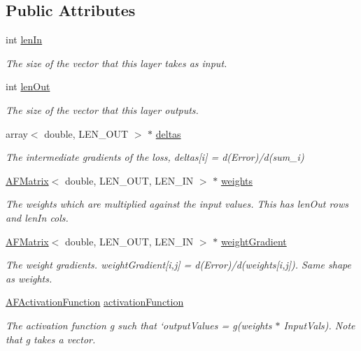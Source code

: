 \subsection*{Public Attributes}
\begin{DoxyCompactItemize}
\item 
int \hyperlink{class_layer_a844e22c542ae02cb475cabb8353300a8}{len\+In}
\begin{DoxyCompactList}\small\item\em The size of the vector that this layer takes as input. \end{DoxyCompactList}\item 
int \hyperlink{class_layer_ae10a61035ba7a18f9f2a6d1d3ebf9811}{len\+Out}
\begin{DoxyCompactList}\small\item\em The size of the vector that this layer outputs. \end{DoxyCompactList}\item 
array$<$ double, L\+E\+N\+\_\+\+O\+UT $>$ $\ast$ \hyperlink{class_layer_aeefbb274f205f4960c4a1a3ed5f5d807}{deltas}
\begin{DoxyCompactList}\small\item\em The intermediate gradients of the loss, {\ttfamily deltas\mbox{[}i\mbox{]} = d(\+Error)/d(sum\+\_\+i)} \end{DoxyCompactList}\item 
\hyperlink{class_a_f_matrix}{A\+F\+Matrix}$<$ double, L\+E\+N\+\_\+\+O\+UT, L\+E\+N\+\_\+\+IN $>$ $\ast$ \hyperlink{class_layer_aa362ee5edaf5b0fe8d5d7c4674ded7a1}{weights}
\begin{DoxyCompactList}\small\item\em The weights which are multiplied against the input values. This has {\ttfamily len\+Out} rows and {\ttfamily len\+In} cols. \end{DoxyCompactList}\item 
\hyperlink{class_a_f_matrix}{A\+F\+Matrix}$<$ double, L\+E\+N\+\_\+\+O\+UT, L\+E\+N\+\_\+\+IN $>$ $\ast$ \hyperlink{class_layer_ab4afc6b6fdda2b5fd21621f40be776fd}{weight\+Gradient}
\begin{DoxyCompactList}\small\item\em The weight gradients. {\ttfamily weight\+Gradient\mbox{[}i,j\mbox{]} = d(\+Error)/d(weights\mbox{[}i,j\mbox{]})}. Same shape as {\ttfamily weights}. \end{DoxyCompactList}\item 
\hyperlink{class_a_f_activation_function}{A\+F\+Activation\+Function} \hyperlink{class_layer_a53bead8fe194586f9ab2f69b11de3d87}{activation\+Function}
\begin{DoxyCompactList}\small\item\em The activation function {\ttfamily g} such that `output\+Values = g(weights $\ast$ Input\+Vals). Note that g takes a vector. \end{DoxyCompactList}\end{DoxyCompactItemize}


